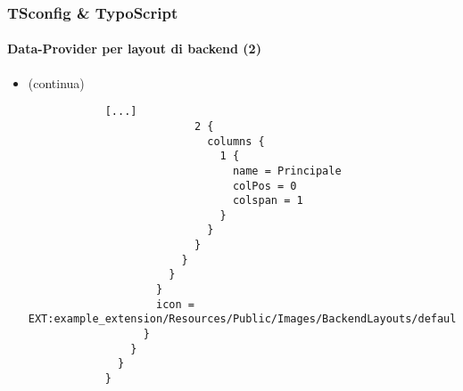 \begin{frame}[fragile]
	\frametitle{TSconfig \& TypoScript}
	\framesubtitle{Data-Provider per layout di backend (2)}

	\lstset{basicstyle=\tiny\ttfamily}

	\begin{itemize}
		\item \smaller(continua)\normalsize
		\begin{lstlisting}
			[...]
			              2 {
			                columns {
			                  1 {
			                    name = Principale
			                    colPos = 0
			                    colspan = 1
			                  }
			                }
			              }
			            }
			          }
			        }
			        icon = EXT:example_extension/Resources/Public/Images/BackendLayouts/default.gif
			      }
			    }
			  }
			}
		\end{lstlisting}
	\end{itemize}

\end{frame}


